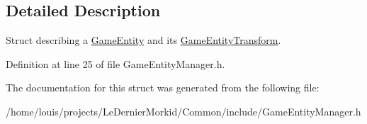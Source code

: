 \subsection{Detailed Description}
Struct describing a \hyperlink{struct_common_1_1_game_entity}{Game\+Entity} and its \hyperlink{struct_common_1_1_game_entity_transform}{Game\+Entity\+Transform}. 

Definition at line 25 of file Game\+Entity\+Manager.\+h.



The documentation for this struct was generated from the following file\+:\begin{DoxyCompactItemize}
\item 
/home/louis/projects/\+Le\+Dernier\+Morkid/\+Common/include/Game\+Entity\+Manager.\+h\end{DoxyCompactItemize}
